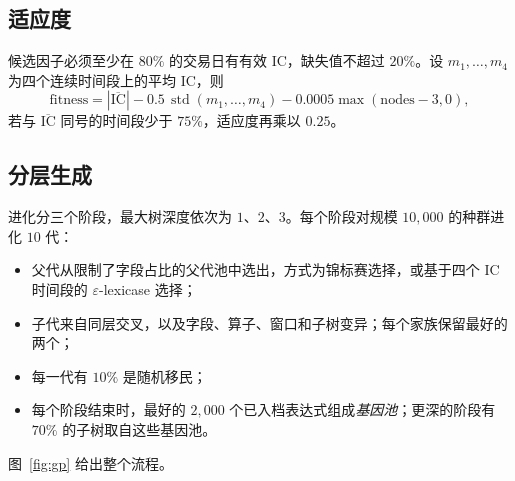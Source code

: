 \documentclass[11pt,a4paper,UTF8,fontset=fandol]{ctexart}
\begin{document}
\subsection{适应度}
\label{sec:fitness}
候选因子必须至少在 $80\%$ 的交易日有有效 IC，缺失值不超过 $20\%$。设 $m_1,\dots,m_4$ 为四个连续时间段上的平均 IC，则
\begin{equation}
  \text{fitness} = |\overline{\mathrm{IC}}| - 0.5\,\operatorname{std}(m_1,\dots,m_4) - 0.0005\max(\text{nodes}-3,0),
\end{equation}
若与 $\overline{\mathrm{IC}}$ 同号的时间段少于 $75\%$，适应度再乘以 $0.25$。

\subsection{分层生成}
进化分三个阶段，最大树深度依次为 $1$、$2$、$3$。每个阶段对规模 $10{,}000$ 的种群进化 $10$ 代：
\begin{itemize}[nosep]
  \item 父代从限制了字段占比的父代池中选出，方式为锦标赛选择，或基于四个 IC 时间段的 $\varepsilon$-lexicase 选择；
  \item 子代来自同层交叉，以及字段、算子、窗口和子树变异；每个家族保留最好的两个；
  \item 每一代有 $10\%$ 是随机移民；
  \item 每个阶段结束时，最好的 $2{,}000$ 个已入档表达式组成\emph{基因池}；更深的阶段有 $70\%$ 的子树取自这些基因池。
\end{itemize}
图~\ref{fig:gp} 给出整个流程。
\end{document}
